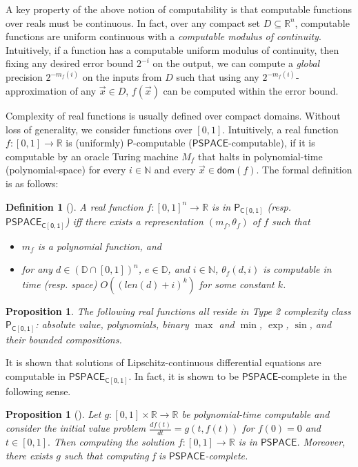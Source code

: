 \documentclass[10pt]{article}
\theoremstyle{plain}
\newtheorem{proposition}[theorem]{Proposition}
\newtheorem{definition}[theorem]{Definition}
\theoremstyle{definition}
\newcommand{\dom}{\mathsf{dom}}
\begin{document}
A key property of the above notion of computability is that computable functions over reals must be continuous. In fact, over any compact set $D\subseteq \mathbb{R}^n$, computable functions are uniform continuous with a {\em computable modulus of continuity}. Intuitively, if a function has a computable uniform modulus of continuity, then fixing any desired error bound $2^{-i}$ on the output, we can compute a {\em global} precision $2^{-m_f(i)}$ on the inputs from $D$ such that using any $2^{-m_f(i)}$-approximation of any $\vec x\in D$, $f(\vec x)$ can be computed within the error bound. 

Complexity of real functions is usually defined over compact domains. Without loss of generality, we consider functions over $[0,1]$. Intuitively, a real function $f:[0,1]\rightarrow\mathbb{R}$ is (uniformly) $\mathsf{P}$-computable ($\mathsf{PSPACE}$-computable), if it is computable by an oracle Turing machine $M_{f}$ that halts in polynomial-time (polynomial-space) for every $i\in \mathbb{N}$ and every $\vec x\in \dom(f)$. The formal definition is as follows:
\begin{definition}[\cite{Kobook}]
A real function $f: [0,1]^n\rightarrow \mathbb{R}$ is in $\mathsf{P_{C[0,1]}}$ (resp. $\mathsf{PSPACE_{C[0,1]}}$) iff there exists a representation $(m_f, \theta_f)$ of $f$ such that
\begin{itemize}
\item $m_f$ is a polynomial function, and 
\item for any $d\in (\mathbb{D}\cap [0,1])^n$, $e\in \mathbb{D}$, and $i\in \mathbb{N}$, $\theta_f(d,i)$ is computable in time (resp. space) $O((\mathit{len}(d)+i)^k)$ for some constant $k$.
\end{itemize}
\end{definition}
\begin{proposition}
The following real functions all reside in Type 2 complexity class $\mathsf{P_{C[0,1]}}$: absolute value, polynomials, binary $\max$ and $\min$, $\exp$, $\sin$, and their bounded compositions. \end{proposition}
It is shown that solutions of Lipschitz-continuous differential equations are computable in $\mathsf{PSPACE_{C[0,1]}}$. In fact, it is shown to be $\mathsf{PSPACE}$-complete in the following sense. 
\begin{proposition}[\cite{Kawamura09}]
Let $g:[0,1]\times \mathbb{R}\rightarrow \mathbb{R}$ be polynomial-time computable and consider the initial value problem $\frac{df(t)}{dt} = g(t, f(t))$ for $f(0)=0$ and $t\in [0,1].$ Then computing the solution $f:[0,1]\rightarrow \mathbb{R}$ is in $\mathsf{PSPACE}$. Moreover, there exists $g$ such that computing f is $\mathsf{PSPACE}$-complete. 
\end{proposition}
\end{document}
